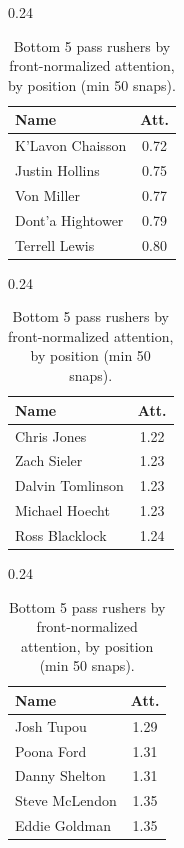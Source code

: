 \begin{table}[h!]
\centering
\begin{subtable}{0.24\textwidth}
\centering
\scriptsize
\begin{tabular}{lc}
\toprule
Name & Att. \\
\midrule
K'Lavon Chaisson & 0.72 \\
Justin Hollins & 0.75 \\
Von Miller & 0.77 \\
Dont'a Hightower & 0.79 \\
Terrell Lewis & 0.80 \\
\bottomrule
\end{tabular}
\caption{Edge}
\end{subtable}
\hfill
\begin{subtable}{0.24\textwidth}
\centering
\scriptsize
\begin{tabular}{lc}
\toprule
Name & Att. \\
\midrule
Chris Jones & 1.22 \\
Zach Sieler & 1.23 \\
Dalvin Tomlinson & 1.23 \\
Michael Hoecht & 1.23 \\
Ross Blacklock & 1.24 \\
\bottomrule
\end{tabular}
\caption{DT}
\end{subtable}
\hfill
\begin{subtable}{0.24\textwidth}
\centering
\scriptsize
\begin{tabular}{lc}
\toprule
Name & Att. \\
\midrule
Josh Tupou & 1.29 \\
Poona Ford & 1.31 \\
Danny Shelton & 1.31 \\
Steve McLendon & 1.35 \\
Eddie Goldman & 1.35 \\
\bottomrule
\end{tabular}
\caption{NT}
\end{subtable}
\caption{Bottom 5 pass rushers by front-normalized attention, by position (min 50 snaps).}
\label{tab:att_bot_norm}
\end{table}
